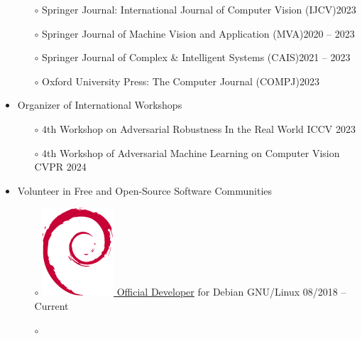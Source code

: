 \documentclass[10pt,margin,line,pifont,palatino,courier]{res}
\begin{document}
\begin{resume}
\begin{itemize}[leftmargin=*]
\begin{itemize}[noitemsep, leftmargin=*]
        \item[$\circ$] Springer Journal: International Journal of Computer Vision (IJCV)\hfill 2023
		\item[$\circ$] Springer Journal of Machine Vision and Application (MVA)\hfill 2020 -- 2023
		\item[$\circ$] Springer Journal of Complex \& Intelligent Systems (CAIS)\hfill 2021 -- 2023
        \item[$\circ$] Oxford University Press: The Computer Journal (COMPJ)\hfill 2023
	\end{itemize}
\item Organizer of International Workshops
    \begin{itemize}[noitemsep, leftmargin=*]
        \item[$\circ$] $4$th Workshop on Adversarial Robustness In the Real World \hfill ICCV  2023
\reversemarginpar{}
        \item[$\circ$] $4$th Workshop of Adversarial Machine Learning on Computer Vision \hfill CVPR 2024
\reversemarginpar{}
    \end{itemize}
\item Volunteer in Free and Open-Source Software Communities
    \begin{itemize}[noitemsep, leftmargin=*]
        \item[$\circ$] \href{https://nm.debian.org/person/lumin/}{
            \includegraphics[height=1.2\fontcharht\font`\B]{openlogo-nd-100.png}
            Official Developer} for Debian GNU/Linux
            \hfill 08/2018 -- Current
        \item[$\circ$] \href{https://wiki.gentoo.org/wiki/Blas-lapack-switch}{
}
\end{itemize}
\end{itemize}
\end{resume}
\end{document}
